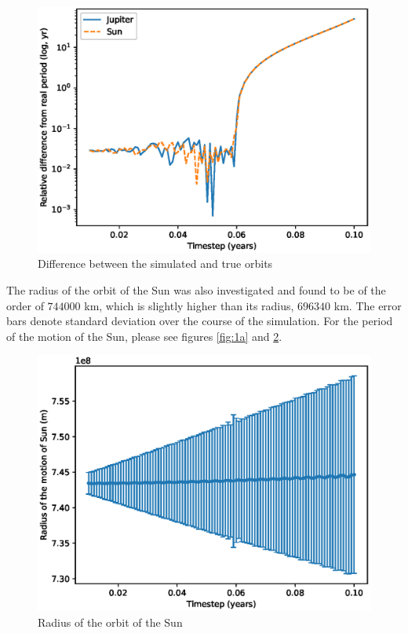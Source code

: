 \documentclass[a4paper]{article}
\begin{document}
\begin{figure}[ht!]
\centering
\includegraphics[width=\textwidth]{fig_1a_2.eps}
\caption{Difference between the simulated and true orbits}
\label{fig:1a_diff}
\end{figure}

\clearpage
The radius of the orbit of the Sun was also investigated and found to be of the order of $744 000$ km, which is slightly higher than its radius, $696 340$ km.
The error bars denote standard deviation over the course of the simulation.
For the period of the motion of the Sun, please see figures \ref{fig:1a} and \ref{fig:1a_diff}.

\begin{figure}[ht!]
\centering
\includegraphics[width=\textwidth]{fig_1a_3.eps}
\caption{Radius of the orbit of the Sun}
\label{fig:1a_diff}
\end{figure}
\end{document}
